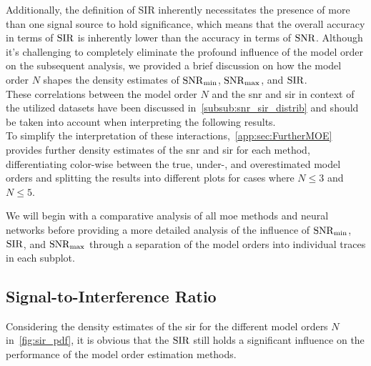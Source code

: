 Additionally, the definition of SIR inherently necessitates the presence of more than one signal source to hold significance,
which means that the overall accuracy in terms of \( \mathrm{SIR} \) is inherently lower than the accuracy in terms of \( \mathrm{SNR} \).
Although it's challenging to completely eliminate the profound influence of the model order on the subsequent analysis,
we provided a brief discussion on how the model order \( N \) shapes the density estimates of \( \mathrm{SNR}_{\min} \), \( \mathrm{SNR}_{\max} \), and \( \mathrm{SIR} \). \\
These correlations between the model order \( N \) and the \gls{snr} and \gls{sir} in context of the utilized datasets
have been discussed in~\autoref{subsub:snr_sir_distrib} and should be taken into account when interpreting the following
results. \\
To simplify the interpretation of these interactions,~\autoref{app:sec:FurtherMOE} provides further density estimates of
the \gls{snr} and \gls{sir} for each method, differentiating color-wise between the true, under-, and overestimated model orders
and splitting the results into different plots for cases where \( N \leq 3 \) and \( N \leq 5 \).

We will begin with a comparative analysis of all \gls{moe} methods and neural networks before providing a more detailed
analysis of the influence of \( \mathrm{SNR}_{\min} \), \( \mathrm{SIR} \), and \( \mathrm{SNR}_{\max} \) through a separation of the model orders into
individual traces in each subplot.

\subsection{Signal-to-Interference Ratio}
\label{subsec:sir}

Considering the density estimates of the \gls{sir} for the different model orders \( N \) in~\autoref{fig:sir_pdf}, it is
obvious that the \( \mathrm{SIR} \) still holds a significant influence on the performance of the model order estimation methods.

